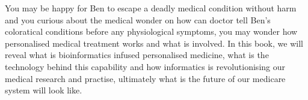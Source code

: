 You may be happy for Ben to escape a deadly medical condition without harm and you curious about the medical wonder on how can doctor tell Ben's coloratical conditions before any physiological symptoms, you may wonder how personalised medical treatment works and what is involved. In this book, we will reveal what is bioinformatics infused personalised medicine, what is the technology behind this capability and how informatics is revolutionising our medical research and practise, ultimately what is the future of our medicare system will look like.